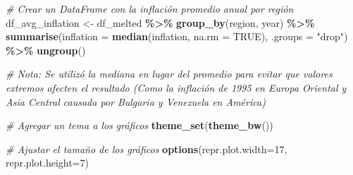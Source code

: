 \documentclass[
]{article}
\newenvironment{Shaded}{\begin{snugshade}}{\end{snugshade}}
\newcommand{\AttributeTok}[1]{\textcolor[rgb]{0.13,0.29,0.53}{#1}}
\newcommand{\CommentTok}[1]{\textcolor[rgb]{0.56,0.35,0.01}{\textit{#1}}}
\newcommand{\ConstantTok}[1]{\textcolor[rgb]{0.56,0.35,0.01}{#1}}
\newcommand{\DecValTok}[1]{\textcolor[rgb]{0.00,0.00,0.81}{#1}}
\newcommand{\FunctionTok}[1]{\textcolor[rgb]{0.13,0.29,0.53}{\textbf{#1}}}
\newcommand{\NormalTok}[1]{#1}
\newcommand{\OtherTok}[1]{\textcolor[rgb]{0.56,0.35,0.01}{#1}}
\newcommand{\SpecialCharTok}[1]{\textcolor[rgb]{0.81,0.36,0.00}{\textbf{#1}}}
\newcommand{\StringTok}[1]{\textcolor[rgb]{0.31,0.60,0.02}{#1}}
\begin{document}
\begin{Shaded}
\begin{Highlighting}[]
\CommentTok{\# Crear un DataFrame con la inflación promedio anual por región}
\NormalTok{df\_avg\_inflation }\OtherTok{\textless{}{-}}\NormalTok{ df\_melted }\SpecialCharTok{\%\textgreater{}\%}
    \FunctionTok{group\_by}\NormalTok{(region, year) }\SpecialCharTok{\%\textgreater{}\%}
    \FunctionTok{summarise}\NormalTok{(}\AttributeTok{inflation =} \FunctionTok{median}\NormalTok{(inflation, }\AttributeTok{na.rm =} \ConstantTok{TRUE}\NormalTok{), }\AttributeTok{.groups =} \StringTok{"drop"}\NormalTok{) }\SpecialCharTok{\%\textgreater{}\%}
    \FunctionTok{ungroup}\NormalTok{()}

\CommentTok{\# Nota: Se utilizó la mediana en lugar del promedio para evitar que valores extremos afecten el resultado (Como la inflación de 1995 en Europa Oriental y Asia Central causada por Bulgaria y Venezuela en América)}

\CommentTok{\# Agregar un tema a los gráficos}
\FunctionTok{theme\_set}\NormalTok{(}\FunctionTok{theme\_bw}\NormalTok{())}

\CommentTok{\# Ajustar el tamaño de los gráficos}
\FunctionTok{options}\NormalTok{(}\AttributeTok{repr.plot.width=}\DecValTok{17}\NormalTok{, }\AttributeTok{repr.plot.height=}\DecValTok{7}\NormalTok{)}


\end{Highlighting}
\end{Shaded}
\end{document}
